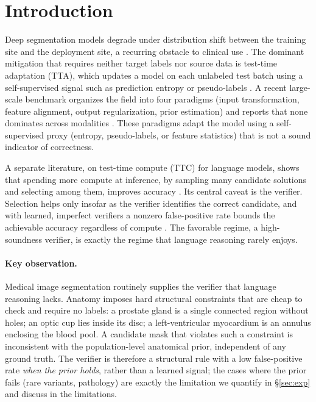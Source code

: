 \documentclass[10pt]{article}
\begin{document}
\section{Introduction}
Deep segmentation models degrade under distribution shift between the training site and the deployment site, a recurring obstacle to clinical use \citep{yu2025medsegtta}. The dominant mitigation that requires neither target labels nor source data is test-time adaptation (TTA), which updates a model on each unlabeled test batch using a self-supervised signal such as prediction entropy or pseudo-labels \citep{wang2021tent,wang2022cotta}. A recent large-scale benchmark organizes the field into four paradigms (input transformation, feature alignment, output regularization, prior estimation) and reports that none dominates across modalities \citep{yu2025medsegtta}. These paradigms adapt the model using a self-supervised proxy (entropy, pseudo-labels, or feature statistics) that is not a sound indicator of correctness.

A separate literature, on test-time compute (TTC) for language models, shows that spending more compute at inference, by sampling many candidate solutions and selecting among them, improves accuracy \citep{snell2024scaling,brown2024monkeys}. Its central caveat is the verifier. Selection helps only insofar as the verifier identifies the correct candidate, and with learned, imperfect verifiers a nonzero false-positive rate bounds the achievable accuracy regardless of compute \citep{stroebl2024verifier,setlur2025verifier}. The favorable regime, a high-soundness verifier, is exactly the regime that language reasoning rarely enjoys.

\paragraph{Key observation.} Medical image segmentation routinely supplies the verifier that language reasoning lacks. Anatomy imposes hard structural constraints that are cheap to check and require no labels: a prostate gland is a single connected region without holes; an optic cup lies inside its disc; a left-ventricular myocardium is an annulus enclosing the blood pool. A candidate mask that violates such a constraint is inconsistent with the population-level anatomical prior, independent of any ground truth. The verifier is therefore a structural rule with a low false-positive rate \emph{when the prior holds}, rather than a learned signal; the cases where the prior fails (rare variants, pathology) are exactly the limitation we quantify in \S\ref{sec:exp} and discuss in the limitations.
\end{document}
